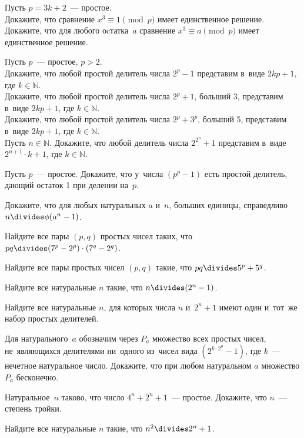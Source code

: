 \begin{problems}

\item
Пусть $p = 3 k + 2$~— простое.
\\
\subproblem
Докажите, что сравнение $x^3 \equiv 1 \pmod{p}$ имеет единственное решение.
\\
\subproblem
Докажите, что для любого оcтатка~$a$ сравнение $x^3 \equiv a \pmod{p}$ имеет
единственное решение.

\item
Пусть $p$~— простое, $p > 2$.
\\
\subproblem
Докажите, что любой простой делитель числа $2^p - 1$ представим
в~виде $2 k p + 1$, где $k \in \mathbb{N}$.
\\
\subproblem
Докажите, что любой простой делитель числа $2^p + 1$, больший 3, представим
в~виде $2 k p + 1$, где $k \in \mathbb{N}$.
\\
\subproblem
Докажите, что любой простой делитель числа $2^p + 3^p$, больший 5, представим
в~виде $2 k p + 1$, где $k \in \mathbb{N}$.
\\
\subproblem
Пусть $n \in \mathbb{N}$.
Докажите, что любой делитель числа $2^{2^n} + 1$ представим
в~виде $2^{n+1} \cdot k + 1$, где $k \in \mathbb{N}$.

\item
Пусть $p$~— простое.
Докажите, что у~числа $(p^p - 1)$ есть простой делитель, дающий остаток 1 при
делении на~$p$.

\item
Докажите, что для любых натуральных $a$ и~$n$, больших единицы, справедливо
$n \divides \mathrm{\phi}(a^n - 1)$.

\item
Найдите все пары $(p, q)$ простых чисел таких, что
$p q \divides (7^{p} - 2^{p}) \cdot (7^{q} - 2^{q})$.

\item
Найдите все пары простых чисел $(p, q)$ такие, что $p q \divides 5^{p} + 5^{q}$.

\item
Найдите все натуральные $n$ такие, что $n \divides (2^n - 1)$.

\item
Найдите все натуральные $n$, для которых числа $n$ и~$2^n + 1$ имеют один
и~тот~же набор простых делителей. 	

\item
Для натурального~$a$ обозначим через $P_a$ множество всех простых чисел,
не~являющихся делителями ни~одного из~чисел вида $(2^{k \cdot 2^a} - 1)$, где
$k$~— нечетное натуральное число.
Докажите, что при любом натуральном $a$ множество $P_a$ бесконечно.

\item
Натуральное~$n$ таково, что число $4^n + 2^n + 1$~— простое.
Докажите, что $n$~— степень тройки.

\item
Найдите все натуральные $n$ такие, что $n^2 \divides 2^n + 1$.

\end{problems}


